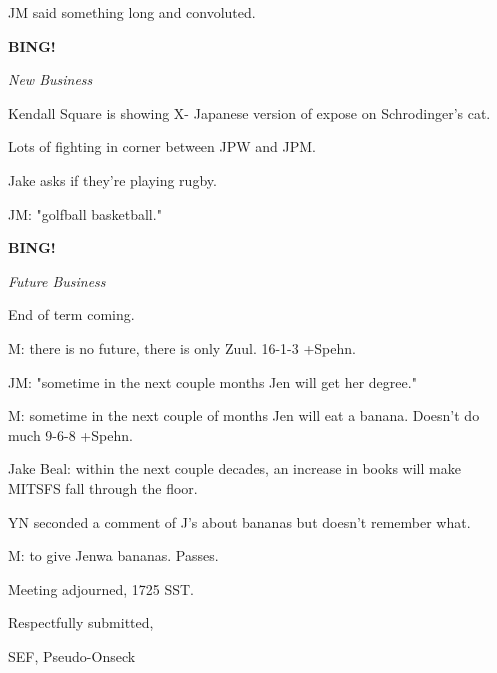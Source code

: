 \documentclass[12pt]{article}
\newcommand{\bing}{{\bf BING!} }
\newcommand{\goto}[1]{\bing \vskip 12pt \centerline{{\em{#1}}}}
\begin{document}
JM said something long and convoluted.

\goto{New Business}

Kendall Square is showing X- Japanese version of expose on Schrodinger's cat.

Lots of fighting in corner between JPW and JPM.

Jake asks if they're playing rugby.

JM: "golfball basketball."

\goto{Future Business}

End of term coming.

M: there is no future, there is only Zuul. 16-1-3 +Spehn.

JM: "sometime in the next couple months Jen will get her degree."

M: sometime in the next couple of months Jen will eat a banana. Doesn't do much 9-6-8 +Spehn.

Jake Beal: within the next couple decades, an increase in books will make MITSFS fall through the floor.

YN seconded a comment of J's about bananas but doesn't remember what.

M: to give Jenwa bananas. Passes.

\vspace{12pt}

\noindent
Meeting adjourned, 1725 SST.

\vspace{18pt}

\centerline{Respectfully submitted,}
\centerline{SEF, Pseudo-Onseck}
\end{document}
